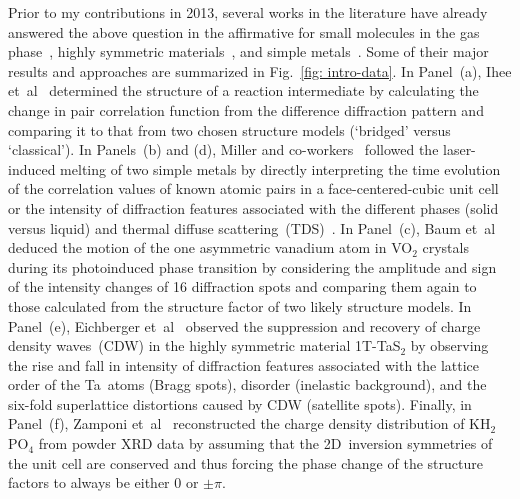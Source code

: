 Prior to my contributions in 2013,
several works in the literature have already answered the above question
in the affirmative for small molecules in the gas phase~\cite{Ihee2001},
highly symmetric materials~\cite{Baum2007, Eichberger2010, Zamponi2012},
and simple metals~\cite{Siwick2003, Ernstorfer2009}.
%
Some of their major results and approaches are summarized in Fig.~\ref{fig: intro-data}.
%
In Panel~(a), Ihee et~al~\cite{Ihee2001} determined the structure of a reaction intermediate
by calculating the change in pair correlation function from the difference diffraction pattern
and comparing it to that from two chosen structure models (`bridged' versus `classical').
%
In Panels~(b) and (d), Miller and co-workers~\cite{Siwick2003, Ernstorfer2009}
followed the laser-induced melting of two simple metals by directly interpreting
the time evolution of the correlation values of known atomic pairs
in a face-centered-cubic unit cell~\cite{Siwick2003} or the intensity of diffraction features
associated with the different phases (solid versus liquid) and
thermal diffuse scattering~(TDS)~\cite{Ernstorfer2009}.
%
In Panel~(c), Baum et~al~\cite{Baum2007} deduced the motion of the one asymmetric vanadium atom
in VO$_2$ crystals during its photoinduced phase transition
by considering the amplitude and sign of the intensity changes of 16 diffraction spots
and comparing them again to those calculated from the structure factor of
two likely structure models.
%
In Panel~(e), Eichberger et~al~\cite{Eichberger2010} observed the suppression and recovery
of charge density waves~(CDW) in the highly symmetric material {1T-TaS$_2$}
by observing the rise and fall in intensity of diffraction features associated with
the lattice order of the Ta~atoms (Bragg spots), disorder (inelastic background),
and the six-fold superlattice distortions caused by CDW (satellite spots).
%
Finally, in Panel~(f), Zamponi et~al~\cite{Zamponi2012} reconstructed the charge density distribution
of {KH$_2$PO$_4$} from powder XRD data by assuming that the 2D~inversion symmetries of the unit cell
are conserved and thus forcing the phase change of the structure factors
to always be either $0$ or $\pm \pi$.

